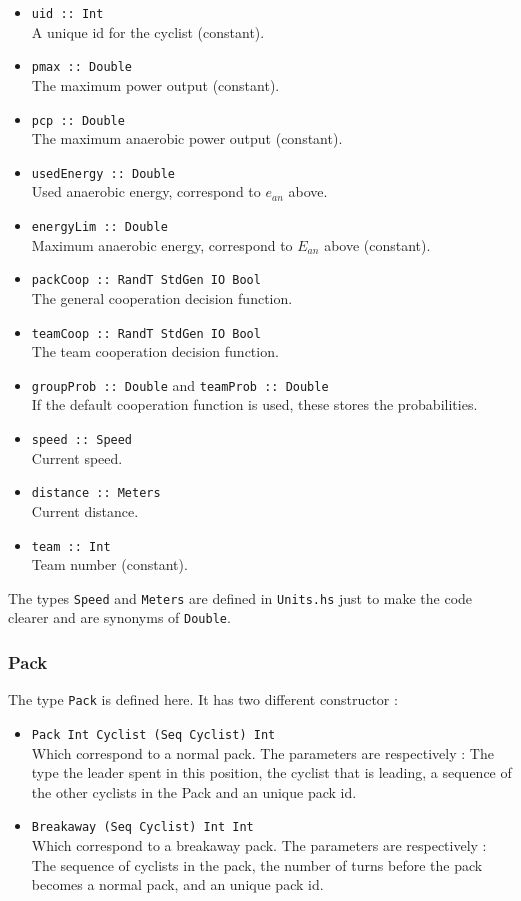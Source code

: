 \documentclass[10pt, a4paper]{report}
\begin{document}
\begin{itemize}
\item \texttt{uid :: Int} \\ A unique id for the cyclist (constant).
\item \texttt{pmax :: Double} \\ The maximum power output (constant).
\item \texttt{pcp :: Double} \\ The maximum anaerobic power output (constant).
\item \texttt{usedEnergy :: Double} \\ Used anaerobic energy, correspond to $e_{an}$ above.
\item \texttt{energyLim :: Double} \\ Maximum anaerobic energy, correspond to $E_{an}$ above (constant).
\item \texttt{packCoop :: RandT StdGen IO Bool} \\ The general cooperation decision function.
\item \texttt{teamCoop :: RandT StdGen IO Bool} \\ The team cooperation decision function.
\item \texttt{groupProb :: Double} and \texttt{teamProb :: Double} \\ If the default cooperation function is used, these stores the probabilities.
\item \texttt{speed :: Speed} \\ Current speed.
\item \texttt{distance :: Meters} \\ Current distance.
\item \texttt{team :: Int} \\ Team number (constant).
\end{itemize}

The types \texttt{Speed} and \texttt{Meters} are defined in \texttt{Units.hs} just to make the code clearer and are synonyms of \texttt{Double}.

\subsubsection{Pack}

The type \texttt{Pack} is defined here. It has two different constructor :

\begin{itemize}
\item \texttt{Pack Int Cyclist (Seq Cyclist) Int} \\ Which correspond to a normal pack. The parameters are respectively : The type the leader spent in this position, the cyclist that is leading, a sequence of the other cyclists in the Pack and an unique pack id.
\item \texttt{Breakaway (Seq Cyclist) Int Int} \\ Which correspond to a breakaway pack. The parameters are respectively : The sequence of cyclists in the pack, the number of turns before the pack becomes a normal pack, and an unique pack id.
\end{itemize}
\end{document}

